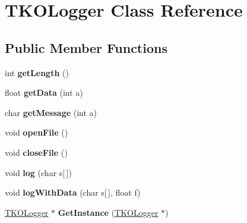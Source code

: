 \hypertarget{classTKOLogger}{\section{\-T\-K\-O\-Logger \-Class \-Reference}
\label{classTKOLogger}
}
\subsection*{\-Public \-Member \-Functions}
\begin{DoxyCompactItemize}
\item 
\hypertarget{classTKOLogger_ab174d97951b3725ae83cc28c353dffcd}{int {\bfseries get\-Length} ()}\label{classTKOLogger_ab174d97951b3725ae83cc28c353dffcd}

\item 
\hypertarget{classTKOLogger_aa8418f13e3ececfdeabef133a24a8489}{float {\bfseries get\-Data} (int a)}\label{classTKOLogger_aa8418f13e3ececfdeabef133a24a8489}

\item 
\hypertarget{classTKOLogger_a7d028a1664f3bfbe648daa83cb92bd7c}{char {\bfseries get\-Message} (int a)}\label{classTKOLogger_a7d028a1664f3bfbe648daa83cb92bd7c}

\item 
\hypertarget{classTKOLogger_ac896ef3256df31be955830348df89a84}{void {\bfseries open\-File} ()}\label{classTKOLogger_ac896ef3256df31be955830348df89a84}

\item 
\hypertarget{classTKOLogger_ac5c6af7d58c9f42e70d6f0d514bf0c2b}{void {\bfseries close\-File} ()}\label{classTKOLogger_ac5c6af7d58c9f42e70d6f0d514bf0c2b}

\item 
\hypertarget{classTKOLogger_a196755a5efecd25ae8e9581bdae55900}{void {\bfseries log} (char s\mbox{[}$\,$\mbox{]})}\label{classTKOLogger_a196755a5efecd25ae8e9581bdae55900}

\item 
\hypertarget{classTKOLogger_a8b82e6a1de57a844b8c320b32bceed93}{void {\bfseries log\-With\-Data} (char s\mbox{[}$\,$\mbox{]}, float f)}\label{classTKOLogger_a8b82e6a1de57a844b8c320b32bceed93}

\item 
\hypertarget{classTKOLogger_a1383c8e6936ce6d909fe3ab57e0f1cc8}{\hyperlink{classTKOLogger}{\-T\-K\-O\-Logger} $\ast$ {\bfseries \-Get\-Instance} (\hyperlink{classTKOLogger}{\-T\-K\-O\-Logger} $\ast$)}\label{classTKOLogger_a1383c8e6936ce6d909fe3ab57e0f1cc8}

\end{DoxyCompactItemize}
